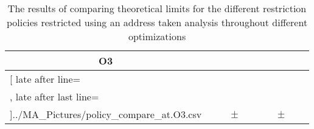 \begin{table}[!htbp]
{\begin{tabular}{l|c|rcl|c|rcl|c}
\multicolumn{1}{c}{\bfseries O3}
	\\\midrule
	\csvreader[ late after line=\\, late after last line=\\\bottomrule]{../MA_Pictures/policy_compare_at.O3.csv}{
}
	{\csvcolii  &  \csvcoliii & \csvcolx & $\pm$ & \csvcolxi & \csvcolxii & \csvcolxix & $\pm$ & \csvcolxx& \csvcolxxi}%

    	\end{tabular}
}
		\caption {The results of comparing theoretical limits for the different restriction policies restricted using an address taken analysis throughout different optimizations}
		\label{tbl:policycompat}
\end{table}


